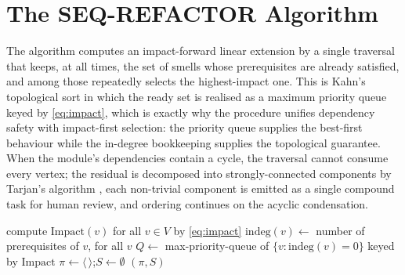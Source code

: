 \documentclass[journal,onecolumn,11pt]{IEEEtran}
\begin{document}
\section{The SEQ-REFACTOR Algorithm}
\label{sec:algo}
The algorithm computes an impact-forward linear extension by a single traversal that keeps, at all times, the set of smells whose prerequisites are already satisfied, and among those repeatedly selects the highest-impact one. This is Kahn's topological sort \cite{kahn1962} in which the ready set is realised as a maximum priority queue keyed by \eqref{eq:impact}, which is exactly why the procedure unifies dependency safety with impact-first selection: the priority queue supplies the best-first behaviour while the in-degree bookkeeping supplies the topological guarantee. When the module's dependencies contain a cycle, the traversal cannot consume every vertex; the residual is decomposed into strongly-connected components by Tarjan's algorithm \cite{tarjan1972}, each non-trivial component is emitted as a single compound task for human review, and ordering continues on the acyclic condensation.

\begin{algorithm}[t]
\SetAlgoLined
\DontPrintSemicolon
{}
compute $\mathrm{Impact}(v)$ for all $v\in V$ by \eqref{eq:impact}\;
$\mathrm{indeg}(v)\leftarrow$ number of prerequisites of $v$, for all $v$\;
$Q\leftarrow$ max-priority-queue of $\{v : \mathrm{indeg}(v)=0\}$ keyed by $\mathrm{Impact}$\;
$\pi\leftarrow\langle\,\rangle$;\quad $S\leftarrow\emptyset$\;
\Return $(\pi, S)$\;
\caption{SEQ-REFACTOR ordering}
\label{alg:order}
\end{algorithm}
\end{document}
